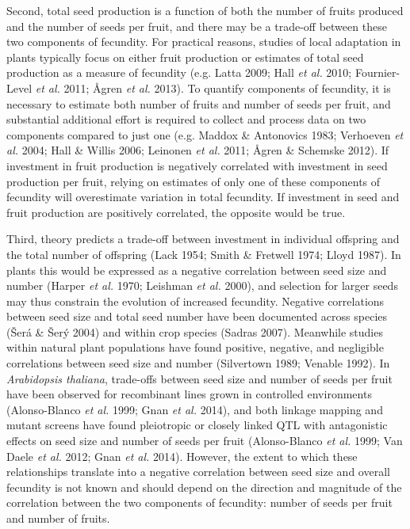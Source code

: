 \documentclass[]{article}
\begin{document}
Second, total seed production is a function of both the number of fruits produced and the number of seeds per fruit, and there may be a trade-off between these two components of fecundity. For practical reasons, studies of local adaptation in plants typically focus on either fruit production or estimates of total seed production as a measure of fecundity (e.g. Latta 2009; Hall \emph{et al.} 2010; Fournier-Level \emph{et al.} 2011; Ågren \emph{et al.} 2013). To quantify components of fecundity, it is necessary to estimate both number of fruits and number of seeds per fruit, and substantial additional effort is required to collect and process data on two components compared to just one (e.g. Maddox \& Antonovics 1983; Verhoeven \emph{et al.} 2004; Hall \& Willis 2006; Leinonen \emph{et al.} 2011; Ågren \& Schemske 2012). If investment in fruit production is negatively correlated with investment in seed production per fruit, relying on estimates of only one of these components of fecundity will overestimate variation in total fecundity. If investment in seed and fruit production are positively correlated, the opposite would be true.

Third, theory predicts a trade-off between investment in individual offspring and the total number of offspring (Lack 1954; Smith \& Fretwell 1974; Lloyd 1987). In plants this would be expressed as a negative correlation between seed size and number (Harper \emph{et al.} 1970; Leishman \emph{et al.} 2000), and selection for larger seeds may thus constrain the evolution of increased fecundity. Negative correlations between seed size and total seed number have been documented across species (Šerá \& Šerý 2004) and within crop species (Sadras 2007). Meanwhile studies within natural plant populations have found positive, negative, and negligible correlations between seed size and number (Silvertown 1989; Venable 1992). In \emph{Arabidopsis thaliana}, trade-offs between seed size and number of seeds per fruit have been observed for recombinant lines grown in controlled environments (Alonso-Blanco \emph{et al.} 1999; Gnan \emph{et al.} 2014), and both linkage mapping and mutant screens have found pleiotropic or closely linked QTL with antagonistic effects on seed size and number of seeds per fruit (Alonso-Blanco \emph{et al.} 1999; Van Daele \emph{et al.} 2012; Gnan \emph{et al.} 2014). However, the extent to which these relationships translate into a negative correlation between seed size and overall fecundity is not known and should depend on the direction and magnitude of the correlation between the two components of fecundity: number of seeds per fruit and number of fruits.
\end{document}
